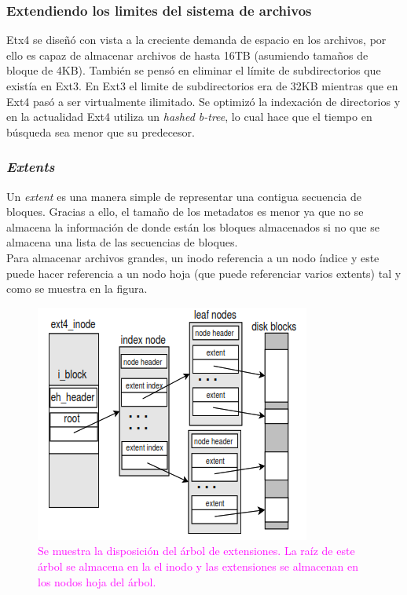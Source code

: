 \subsubsection{Extendiendo los limites del sistema de archivos}
Etx4 se diseñó con vista a la creciente demanda de espacio en los archivos, por ello es capaz de almacenar archivos de hasta 16TB (asumiendo tamaños de bloque de 4KB). También se pensó en eliminar el límite de subdirectorios que existía en Ext3. En Ext3 el limite de subdirectorios era de 32KB mientras que en Ext4 pasó a ser virtualmente ilimitado. Se optimizó la indexación de directorios y en la actualidad Ext4 utiliza un \textit{hashed b-tree}, lo cual hace que el tiempo en búsqueda sea menor que su predecesor. \cite{jones_2009}

\subsubsection{\textit{Extents}}
Un \textit{extent} es una manera simple de representar una contigua secuencia de bloques. Gracias a ello, el tamaño de los metadatos es menor ya que no se almacena la información de donde están los bloques almacenados si no que se almacena una lista de las secuencias de bloques.\\

Para almacenar archivos grandes, un inodo referencia a un nodo índice y este puede hacer referencia a un nodo hoja (que puede referenciar varios extents) tal y como se muestra en la figura.

\begin{figure}[H]
    \centering
    \includegraphics{doc/assets/images/ext4/ext4_map_extent_tree.PNG}
    \caption{\textcolor{magenta}{ Se muestra la disposición del árbol de extensiones. La raíz de este árbol se almacena en la  el inodo y las extensiones se almacenan en los nodos hoja del árbol. \cite{Mathur2007}}}
    \label{fig:Ext4 Extent Tree}
\end{figure}


